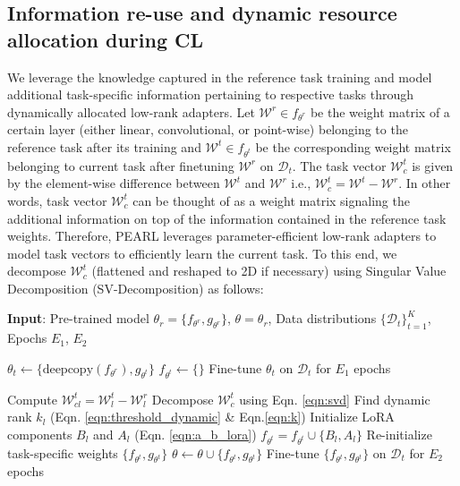 \documentclass[10pt]{article} %
\begin{document}
\subsection{Information re-use and dynamic resource allocation  during CL}

We leverage the knowledge captured in the reference task training and model additional task-specific information pertaining to respective tasks through dynamically allocated low-rank adapters. Let $\mathcal{W}^{r} \in f_{\theta^{r}}$ be the weight matrix of a certain layer (either linear, convolutional, or point-wise) belonging to the reference task after its training and $\mathcal{W}^{t} \in f_{\theta^{t}}$ be the  corresponding weight matrix belonging to current task after finetuning $\mathcal{W}^{r}$ on $\mathcal{D}_t$. The task vector $\mathcal{W}^{t}_{c}$ is given by the element-wise difference between $\mathcal{W}^{t}$ and $\mathcal{W}^{r}$ i.e., $\mathcal{W}^{t}_{c}= \mathcal{W}^{t} - \mathcal{W}^{r}$. In other words, task vector $\mathcal{W}^{t}_{c}$ can be thought of as a weight matrix signaling the additional information on top of the information contained in the reference task weights. Therefore, PEARL leverages parameter-efficient low-rank adapters to model task vectors to efficiently learn the current task. To this end, we decompose  $\mathcal{W}^{t}_{c}$ (flattened and reshaped to 2D if necessary) using Singular Value Decomposition (SV-Decomposition) as follows: 


\begin{algorithm}[tb]
\caption{PEARL (with pre-training)}
\label{alg:PEARL_pretraining}
\begin{algorithmic}[1]
   \State \textbf{Input}: Pre-trained model $\theta_r = \{f_{\theta^{r}}, g_{\theta^{r}}\}$, $\theta = \theta_r$, Data distributions $\{\mathcal{D}_t\}_{t=1}^K$, Epochs $E_1$, $E_2$
   
        \State $\theta_t \gets \{\text{deepcopy}(f_{\theta^{r}}), g_{\theta^{t}} \}$
        \State $f_{\theta^{t}} \gets \{\}$
        \State Fine-tune $\theta_t$ on $\mathcal{D}_t$ for $E_1$ epochs

           \State Compute $\mathcal{W}^{t}_{cl}= \mathcal{W}^{t}_{l} - \mathcal{W}^{r}_{l}$ 
           \State Decompose $\mathcal{W}_c^t$ using Eqn. \ref{eqn:svd}
           \State Find dynamic rank $k_l$ (Eqn. \ref{eqn:threshold_dynamic} \& Eqn.\ref{eqn:k})
           \State Initialize LoRA components $B_l$ and $A_l$ (Eqn. \ref{eqn:a_b_lora})
           \State $f_{\theta^{t}} = f_{\theta^{t}} \cup \{B_l, A_l\}$
        \EndFor 
    \State Re-initialize task-specific weights $\{f_{\theta^{t}}, g_{\theta^{t}}\}$
    \State $\theta \gets \theta \cup \{f_{\theta^{t}}, g_{\theta^{t}}\}$
    \State Fine-tune $\{f_{\theta^{t}}, g_{\theta^{t}}\}$ on $\mathcal{D}_t$ for $E_2$ epochs
   \EndFor
{}
\end{algorithmic}
\end{algorithm}
\end{document}
